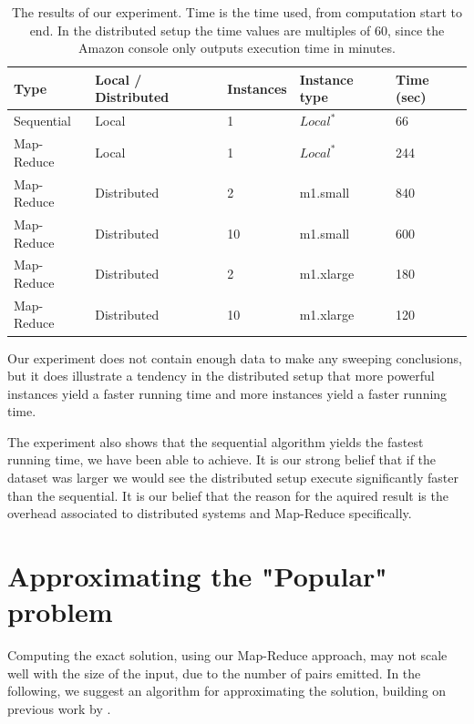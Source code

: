 \documentclass[a4paper,11pt]{article}
\begin{document}
\begin{table}[H]

\begin{center}
    \begin{tabular}{|l|l|l|l|l|}
    \hline
    Type       & Local / Distributed & Instances & Instance type                     & Time (sec) \\ \hline
    Sequential & Local               & 1         & $Local^*$ & 66                 \\ \hline
    Map-Reduce & Local               & 1         & $Local^*$ & 244                 \\ \hline
    Map-Reduce & Distributed         & 2         & m1.small                          & 840                 \\ \hline
    Map-Reduce & Distributed         & 10        & m1.small                          & 600                 \\ \hline
    Map-Reduce & Distributed         & 2         & m1.xlarge                         & 180                 \\ \hline
    Map-Reduce & Distributed         & 10        & m1.xlarge                         & 120                 \\ \hline
    \end{tabular}
    \end{center}
    \caption{The results of our experiment. Time is the time used, from computation start to end. In the distributed setup the time values are multiples of 60, since the Amazon console only outputs execution time in minutes.}\label{tab:benchmark}
\end{table}
Our experiment does not contain enough data to make any sweeping conclusions, but it does illustrate a tendency in the distributed setup that more powerful instances yield a faster running time and more instances yield a faster running time. 

The experiment also shows that the sequential algorithm yields the fastest running time, we have been able to achieve. 
It is our strong belief that if the dataset was larger we would see the distributed setup execute significantly faster than the sequential. It is our belief that the reason for the aquired result is the overhead associated to distributed systems and Map-Reduce specifically.

\section{Approximating the "Popular" problem}
Computing the exact solution, using our Map-Reduce approach, may not scale well with the size of the input, due to the number of pairs emitted. In the following, we suggest an algorithm for approximating the solution, building on previous work by \cite{paper:amossen}.
\end{document}
